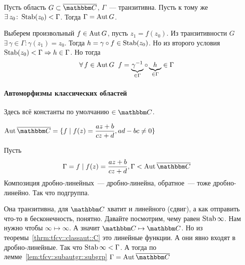\documentclass[12pt,timbord]{../../../notes}
\begin{document}
\begin{lem}\label{lem:tfcv::subautgr::subgrp}
  Пусть область $G\subset \exC$, $\Gamma$~--- транзитивна. Пусть к тому же $\exists\, z_0 \colon
  \operatorname{Stab}(z_0) < \Gamma$. Тогда $\Gamma=\operatorname{Aut} G$.
\end{lem}
\begin{itlproof}
  Выберем произвольный $f \in \operatorname{Aut} G$, пусть $z_1 = f(z_0)$. Из транзитивности $G$ 
  $\exists\, \gamma\in \Gamma\colon \gamma(z_1) = z_0$. Тогда $h = \gamma\circ f\in \operatorname{Stab} (z_0)$.
  Но из второго условия $\operatorname{Stab} (z_0) < \Gamma \Rightarrow h \in \Gamma$. Но тогда 
  \[
    \forall\, f\in \operatorname{Aut} G  \;\;f = \underbrace{\gamma^{-1}}_{\in \Gamma} \circ \underbrace{h}_{\in
    \Gamma} \in \Gamma
  \]
\end{itlproof}

\paragraph{Автоморфизмы классических областей}
\label{par:tfcv::classaut}
Здесь всё константы по умолчанию $\in \C$.
\begin{thrm}\label{thrm:tfcv::classaut::exC}
  $\displaystyle \Aut \exC  = \{f \mid f(z) = \frac{az+b}{cz+d}, ad-bc \neq 0\}$
\end{thrm}
\begin{ittproof}
  Пусть \[
    \Gamma = {f\mid f(z) = \frac{{a z + b}}{cz+d}}, \Gamma < \Aut \exC
  \]
  Композиция дробно-линейных~--- дробно-линейна, обратное~--- тоже дробно-линейно. Так что
  подгруппа. 

  Она транзитивна, для $\C$ хватит и линейного (сдвиг), а как отправить что-то в бесконечность, понятно.
  Давайте посмотрим, чему равен $\operatorname{Stab} \infty$. Нам нужно чтобы $\infty \mapsto \infty$. А значит
  $\C \mapsto \C$. Но из теоремы~\ref{thrm:tfcv::classaut::C} это линейные функции. А они явно
  входят в дробно-линейные. Так что $\operatorname{Stab} \infty < \Gamma$. А тогда по
  лемме~\ref{lem:tfcv::subautgr::subgrp} $\Gamma = \Aut \exC$
\end{ittproof}
\end{document}
